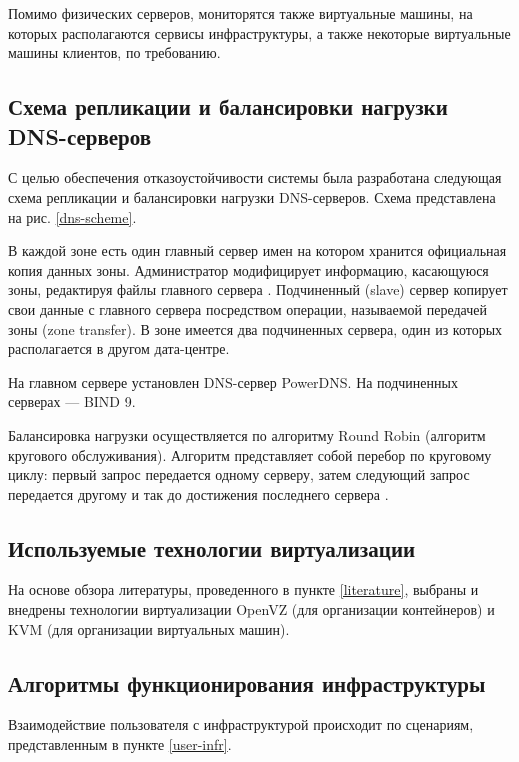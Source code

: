 Помимо физических серверов, мониторятся также виртуальные машины, на которых располагаются сервисы инфраструктуры, а также некоторые виртуальные машины клиентов, по требованию.

\subsection{Схема репликации и балансировки нагрузки DNS-серверов}

С целью обеспечения отказоустойчивости системы была разработана следующая схема репликации и балансировки нагрузки DNS-серверов.
Схема представлена на рис. \ref{dns-scheme}.

В каждой зоне есть один главный сервер имен на котором хранится официальная копия данных зоны.
Администратор модифицирует информацию, касающуюся зоны, редактируя файлы главного сервера \cite{unix-handbook}.
Подчиненный (slave) сервер копирует свои данные с главного сервера посредством операции, называемой передачей зоны (zone transfer).
В зоне имеется два подчиненных сервера, один из которых располагается в другом дата-центре.

На главном сервере установлен DNS-сервер PowerDNS.
На подчиненных серверах --- BIND 9.

Балансировка нагрузки осуществляется по алгоритму Round Robin (алгоритм кругового обслуживания).
Алгоритм представляет собой перебор по круговому циклу: первый запрос передается одному серверу, затем следующий запрос передается другому и так до достижения последнего сервера \cite{selectel}.

\subsection{Используемые технологии виртуализации}

На основе обзора литературы, проведенного в пункте \ref{literature}, выбраны и внедрены технологии виртуализации OpenVZ (для организации контейнеров) и KVM (для организации виртуальных машин).

\subsection{Алгоритмы функционирования инфраструктуры} \label{algo}

Взаимодействие пользователя с инфраструктурой происходит по сценариям, представленным в пункте \ref{user-infr}.

